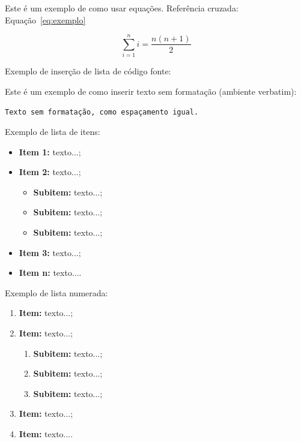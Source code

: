 Este é um exemplo de como usar equações. Referência cruzada: Equação~\ref{eq:exemplo}

\begin{equation}
\sum_{i=1}^{n} i = \frac{n(n+1)}{2}
\label{eq:exemplo}
\end{equation}


Exemplo de inserção de lista de código fonte:

 



Este é um exemplo de como inserir texto sem formatação (ambiente verbatim):

\begin{verbatim}
Texto sem formatação, como espaçamento igual.
\end{verbatim}


Exemplo de lista de itens:

\begin{itemize}
	\item \textbf{Item 1:} texto...;
	\item \textbf{Item 2:} texto...;
	\begin{itemize}
		\item \textbf{Subitem:} texto...;
		\item \textbf{Subitem:} texto...;
		\item \textbf{Subitem:} texto...;
	\end{itemize}
	\item \textbf{Item 3:} texto...;
	\item \textbf{Item n:} texto....
\end{itemize}


Exemplo de lista numerada:

\begin{enumerate}
	\item \textbf{Item:} texto...;
	\item \textbf{Item:} texto...;
	\begin{enumerate}
		\item \textbf{Subitem:} texto...;
		\item \textbf{Subitem:} texto...;
		\item \textbf{Subitem:} texto...;
	\end{enumerate}
	\item \textbf{Item:} texto...;
	\item \textbf{Item:} texto....
\end{enumerate}


